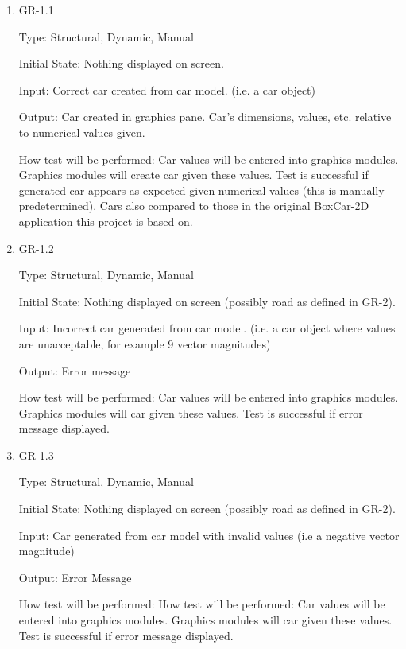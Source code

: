 \documentclass[12pt, titlepage]{article}
\begin{document}
\begin{enumerate}

\item{GR-1.1\\}

Type: Structural, Dynamic, Manual
					
Initial State: Nothing displayed on screen.
					
Input: Correct car created from car model. (i.e. a car object)
					
Output: Car created in graphics pane. Car's dimensions, values, etc. relative to 
numerical values given.
					
How test will be performed: Car values will be entered into graphics modules. 
Graphics modules will create car given these values. Test is successful if generated 
car appears as expected given numerical values (this is manually predetermined). 
Cars also compared to those in the original BoxCar-2D application this project 
is based on.

\item{GR-1.2\\}

Type: Structural, Dynamic, Manual
					
Initial State: Nothing displayed on screen (possibly road as defined in GR-2).
					
Input: Incorrect car generated from car model. (i.e. a car object where values 
are unacceptable, for example 9 vector magnitudes)
					
Output: Error message
					
How test will be performed: Car values will be entered into graphics modules. 
Graphics modules will car given these values. Test is successful if error 
message displayed.

\item{GR-1.3\\}

Type: Structural, Dynamic, Manual
					
Initial State: Nothing displayed on screen (possibly road as defined in GR-2).
					
Input: Car generated from car model with invalid values (i.e a negative vector 
magnitude)
					
Output: Error Message
					
How test will be performed: How test will be performed: Car values will be 
entered into graphics modules. Graphics modules will car given these values. 
Test is successful if error message displayed.
					

\end{enumerate}
\end{document}
